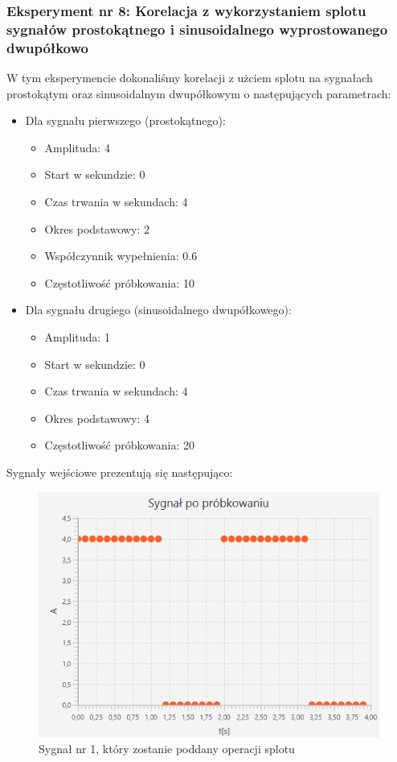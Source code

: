 \documentclass[12pt]{article}
\begin{document}
\subsubsection{Eksperyment nr 8: Korelacja z wykorzystaniem splotu sygnałów prostokątnego i sinusoidalnego wyprostowanego dwupółkowo}
W tym eksperymencie dokonaliśmy korelacji z użciem splotu na sygnałach prostokątym oraz sinusoidalnym dwupółkowym o następujących parametrach:
\begin{itemize}
    \item Dla sygnału pierwszego (prostokątnego):
    \begin{itemize}
        \item Amplituda: 4
        \item Start w sekundzie: 0
        \item Czas trwania w sekundach: 4
        \item Okres podstawowy: 2
        \item Współczynnik wypełnienia: 0.6
        \item Częstotliwość próbkowania: 10
    \end{itemize}
    \item Dla sygnału drugiego (sinusoidalnego dwupółkowego): 
    \begin{itemize}
        \item Amplituda: 1 
        \item Start w sekundzie: 0 
        \item Czas trwania w sekundach: 4
        \item Okres podstawowy: 4
        \item Częstotliwość próbkowania: 20
    \end{itemize}
\end{itemize}
Sygnały wejściowe prezentują się następująco:
\begin{figure}[H]
    \centering
	\includegraphics[width=\linewidth]{sygnal_po_probkowaniu_4.1.png}
    \caption{Sygnał nr 1, który zostanie poddany operacji splotu}
    \label{Sygnał_8.1}
\end{figure}
\end{document}
